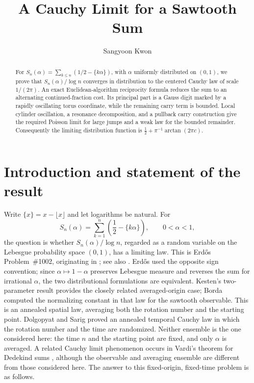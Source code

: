 \documentclass[11pt,a4paper]{amsart}
\title{A Cauchy Limit for a Sawtooth Sum}
\author{Sangyoon Kwon}
\date{}
\theoremstyle{definition}
\theoremstyle{remark}
\begin{document}
\begin{abstract}
For $S_n(\alpha)=\sum_{k\le n}(1/2-\{k\alpha\})$, with $\alpha$ uniformly distributed on $(0,1)$, we prove that $S_n(\alpha)/\log n$ converges in distribution to the centered Cauchy law of scale $1/(2\pi)$.  An exact Euclidean-algorithm reciprocity formula reduces the sum to an alternating continued-fraction cost.  Its principal part is a Gauss digit marked by a rapidly oscillating torus coordinate, while the remaining carry term is bounded.  Local cylinder oscillation, a resonance decomposition, and a pullback carry construction give the required Poisson limit for large jumps and a weak law for the bounded remainder.  Consequently the limiting distribution function is $\frac12+\pi^{-1}\arctan(2\pi c)$.
\end{abstract}

\maketitle

\section{Introduction and statement of the result}

Write $\{x\}=x-\lfloor x\rfloor$ and let logarithms be natural.  For
\[
 S_n(\alpha)=\sum_{k=1}^{n}\left(\frac12-\{k\alpha\}\right),
 \qquad 0<\alpha<1,
\]
the question is whether $S_n(\alpha)/\log n$, regarded as a random variable on
the Lebesgue probability space $(0,1)$, has a limiting law.  This is
Erd\H{o}s Problem~\#1002, originating in \cite{Er64b}; see also
\cite{Bloom1002}.  Erd\H{o}s used the opposite sign convention; since
$\alpha\mapsto1-\alpha$ preserves Lebesgue measure and reverses the
sum for irrational $\alpha$, the two distributional formulations are
equivalent.  Kesten's two-parameter result \cite{Ke60} provides the
closely related averaged-origin case; Borda \cite{Borda25} computed the
normalizing constant in that law for the sawtooth observable.  This is an
annealed spatial law, averaging both the rotation number and the starting
point.  Dolgopyat and Sarig \cite{DS20} proved an annealed temporal Cauchy
law in which the rotation number and the time are randomized.  Neither
ensemble is the one considered here: the time $n$ and the starting point are
fixed, and only $\alpha$ is averaged.  A related Cauchy limit phenomenon
occurs in Vardi's theorem for Dedekind sums \cite{Vardi93}, although the
observable and averaging ensemble are different from those considered here.
The answer to this
fixed-origin, fixed-time problem is as follows.
\end{document}
